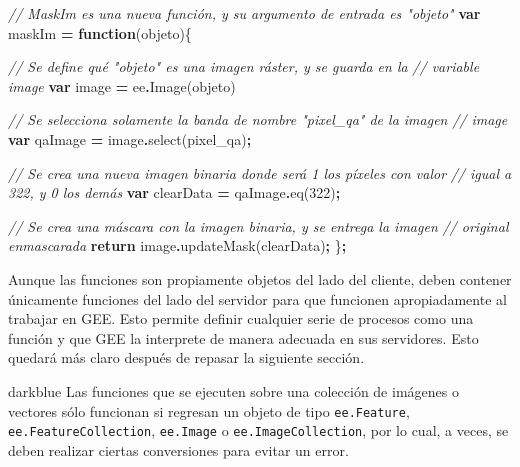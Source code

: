 \documentclass[
  12pt,
  letterpaper,
  twoside]{book}
\newenvironment{Shaded}{\begin{snugshade}}{\end{snugshade}}
\newcommand{\CommentTok}[1]{\textcolor[rgb]{0.56,0.35,0.01}{\textit{#1}}}
\newcommand{\ControlFlowTok}[1]{\textcolor[rgb]{0.13,0.29,0.53}{\textbf{#1}}}
\newcommand{\DecValTok}[1]{\textcolor[rgb]{0.00,0.00,0.81}{#1}}
\newcommand{\FunctionTok}[1]{\textcolor[rgb]{0.00,0.00,0.00}{#1}}
\newcommand{\KeywordTok}[1]{\textcolor[rgb]{0.13,0.29,0.53}{\textbf{#1}}}
\newcommand{\NormalTok}[1]{#1}
\newcommand{\OperatorTok}[1]{\textcolor[rgb]{0.81,0.36,0.00}{\textbf{#1}}}
\newcommand{\StringTok}[1]{\textcolor[rgb]{0.31,0.60,0.02}{#1}}
\begin{document}
\begin{Shaded}
\begin{Highlighting}[]
\CommentTok{// MaskIm es una nueva función, y su argumento de entrada es "objeto"}
\KeywordTok{var}\NormalTok{ maskIm }\OperatorTok{=} \KeywordTok{function}\NormalTok{(objeto)\{ }

\CommentTok{// Se define qué "objeto" es una imagen ráster, y se guarda en la }
\CommentTok{// variable image}
\KeywordTok{var}\NormalTok{ image }\OperatorTok{=}\NormalTok{ ee}\OperatorTok{.}\FunctionTok{Image}\NormalTok{(objeto)     }
 
\CommentTok{// Se selecciona solamente la banda de nombre "pixel\_qa" de la imagen}
\CommentTok{// image}
\KeywordTok{var}\NormalTok{ qaImage }\OperatorTok{=}\NormalTok{ image}\OperatorTok{.}\FunctionTok{select}\NormalTok{(}\StringTok{\textquotesingle{}pixel\_qa\textquotesingle{}}\NormalTok{)}\OperatorTok{;}
     
\CommentTok{// Se crea una nueva imagen binaria donde será 1 los píxeles con valor }
\CommentTok{// igual a 322, y 0 los demás}
\KeywordTok{var}\NormalTok{ clearData }\OperatorTok{=}\NormalTok{ qaImage}\OperatorTok{.}\FunctionTok{eq}\NormalTok{(}\DecValTok{322}\NormalTok{)}\OperatorTok{;}      
    
\CommentTok{// Se crea una máscara con la imagen binaria, y se entrega la imagen }
\CommentTok{// original enmascarada}
\ControlFlowTok{return}\NormalTok{ image}\OperatorTok{.}\FunctionTok{updateMask}\NormalTok{(clearData)}\OperatorTok{;}      
\NormalTok{ \}}\OperatorTok{;}
\end{Highlighting}
\end{Shaded}

Aunque las funciones son propiamente objetos del lado del cliente, deben contener únicamente funciones del lado del servidor para que funcionen apropiadamente al trabajar en GEE. Esto permite definir cualquier serie de procesos como una función y que GEE la interprete de manera adecuada en sus servidores. Esto quedará más claro después de repasar la siguiente sección.

\begin{bluebox2}

\begin{awesomeblock}{5pt}{\faLightbulb}{darkblue}
Las funciones que se ejecuten sobre una colección de imágenes o vectores sólo funcionan si regresan un objeto de tipo \texttt{ee.Feature}, \texttt{ee.FeatureCollection}, \texttt{ee.Image} o \texttt{ee.ImageCollection}, por lo cual, a veces, se deben realizar ciertas conversiones para evitar un error.

\end{awesomeblock}

\end{bluebox2}
\end{document}
